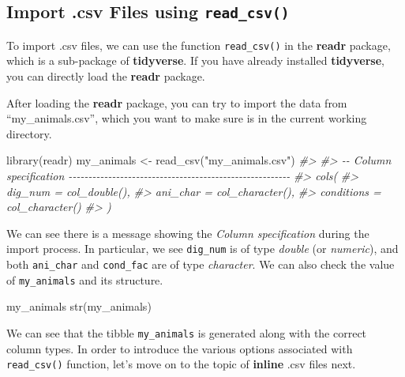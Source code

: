 \documentclass[
]{book}
\newenvironment{Shaded}{\begin{snugshade}}{\end{snugshade}}
\newcommand{\CommentTok}[1]{\textcolor[rgb]{0.56,0.35,0.01}{\textit{#1}}}
\newcommand{\FunctionTok}[1]{\textcolor[rgb]{0.00,0.00,0.00}{#1}}
\newcommand{\NormalTok}[1]{#1}
\newcommand{\OtherTok}[1]{\textcolor[rgb]{0.56,0.35,0.01}{#1}}
\newcommand{\StringTok}[1]{\textcolor[rgb]{0.31,0.60,0.02}{#1}}
\begin{document}
\hypertarget{import-.csv-files-using-read_csv}{%
\subsection{\texorpdfstring{Import .csv Files using \texttt{read\_csv()}}{Import .csv Files using read\_csv()}}\label{import-.csv-files-using-read_csv}}

To import .csv files, we can use the function \texttt{read\_csv()} in the \textbf{readr} package, which is a sub-package of \textbf{tidyverse}. If you have already installed \textbf{tidyverse}, you can directly load the \textbf{readr} package.

After loading the \textbf{readr} package, you can try to import the data from ``my\_animals.csv'', which you want to make sure is in the current working directory.

\begin{Shaded}
\begin{Highlighting}[]
\FunctionTok{library}\NormalTok{(readr)}
\NormalTok{my\_animals }\OtherTok{\textless{}{-}} \FunctionTok{read\_csv}\NormalTok{(}\StringTok{"my\_animals.csv"}\NormalTok{)}
\CommentTok{\#\textgreater{} }
\CommentTok{\#\textgreater{} {-}{-} Column specification {-}{-}{-}{-}{-}{-}{-}{-}{-}{-}{-}{-}{-}{-}{-}{-}{-}{-}{-}{-}{-}{-}{-}{-}{-}{-}{-}{-}{-}{-}{-}{-}{-}{-}{-}{-}{-}{-}{-}{-}{-}{-}{-}{-}{-}{-}{-}{-}{-}{-}{-}{-}{-}{-}{-}{-}}
\CommentTok{\#\textgreater{} cols(}
\CommentTok{\#\textgreater{}   dig\_num = col\_double(),}
\CommentTok{\#\textgreater{}   ani\_char = col\_character(),}
\CommentTok{\#\textgreater{}   conditions = col\_character()}
\CommentTok{\#\textgreater{} )}
\end{Highlighting}
\end{Shaded}

We can see there is a message showing the \emph{Column specification} during the import process. In particular, we see \texttt{dig\_num} is of type \emph{double} (or \emph{numeric}), and both \texttt{ani\_char} and \texttt{cond\_fac} are of type \emph{character}. We can also check the value of \texttt{my\_animals} and its structure.

\begin{Shaded}
\begin{Highlighting}[]
\NormalTok{my\_animals}
\FunctionTok{str}\NormalTok{(my\_animals)}
\end{Highlighting}
\end{Shaded}

We can see that the tibble \texttt{my\_animals} is generated along with the correct column types. In order to introduce the various options associated with \texttt{read\_csv()} function, let's move on to the topic of \textbf{inline} .csv files next.
\end{document}
